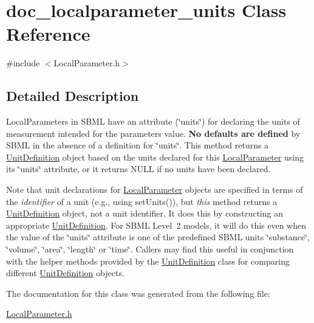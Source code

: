 \hypertarget{classdoc__localparameter__units}{}\section{doc\+\_\+localparameter\+\_\+units Class Reference}
\label{classdoc__localparameter__units}


{\ttfamily \#include $<$Local\+Parameter.\+h$>$}



\subsection{Detailed Description}
\begin{DoxyParagraph}{}
Local\+Parameters in S\+B\+ML have an attribute (\char`\"{}units\char`\"{}) for declaring the units of measurement intended for the parameter\textquotesingle{}s value. {\bfseries No defaults are defined} by S\+B\+ML in the absence of a definition for \char`\"{}units\char`\"{}. This method returns a \hyperlink{class_unit_definition}{Unit\+Definition} object based on the units declared for this \hyperlink{class_local_parameter}{Local\+Parameter} using its \char`\"{}units\char`\"{} attribute, or it returns {\ttfamily N\+U\+LL} if no units have been declared.
\end{DoxyParagraph}
Note that unit declarations for \hyperlink{class_local_parameter}{Local\+Parameter} objects are specified in terms of the {\itshape identifier} of a unit (e.\+g., using set\+Units()), but {\itshape this} method returns a \hyperlink{class_unit_definition}{Unit\+Definition} object, not a unit identifier. It does this by constructing an appropriate \hyperlink{class_unit_definition}{Unit\+Definition}. For S\+B\+ML Level~2 models, it will do this even when the value of the \char`\"{}units\char`\"{} attribute is one of the predefined S\+B\+ML units {\ttfamily \char`\"{}substance\char`\"{}}, {\ttfamily \char`\"{}volume\char`\"{}}, {\ttfamily \char`\"{}area\char`\"{}}, {\ttfamily \char`\"{}length\char`\"{}} or {\ttfamily \char`\"{}time\char`\"{}}. Callers may find this useful in conjunction with the helper methods provided by the \hyperlink{class_unit_definition}{Unit\+Definition} class for comparing different \hyperlink{class_unit_definition}{Unit\+Definition} objects. 

The documentation for this class was generated from the following file\+:\begin{DoxyCompactItemize}
\item 
\hyperlink{_local_parameter_8h}{Local\+Parameter.\+h}\end{DoxyCompactItemize}
